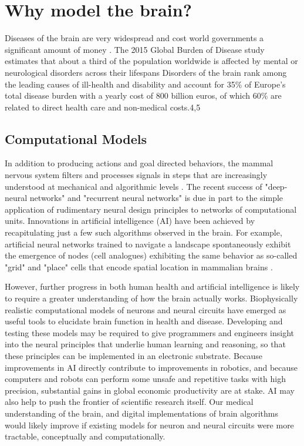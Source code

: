 \section{Why model the brain?}
Diseases of the brain are very widespread and cost world governments a significant amount of money \cite{who}.
The 2015 Global Burden of Disease study estimates that about a third of the population worldwide is affected by mental or neurological disorders across their lifespans
Disorders of the brain rank among the leading causes of ill-health and disability and account for 35\% of Europe’s total disease burden with a yearly cost of 800 billion euros, of which 60\% are related to direct health care and non-medical costs.4,5 %
\subsection{Computational Models}
In addition to producing actions and goal directed behaviors, the mammal nervous system filters and processes signals in steps that are increasingly understood at mechanical and algorithmic levels \cite{marr1976understanding}.
The recent success of "deep-neural networks" and "recurrent neural networks" is due in part to the simple application of rudimentary neural design principles to networks of computational units.
Innovations in artificial intelligence (AI) have been achieved by recapitulating just a few such algorithms observed in the brain.
For example, artificial neural networks trained to navigate a landscape spontaneously exhibit the emergence of nodes (cell analogues) exhibiting the same behavior as so-called "grid" and "place" cells that encode spatial location in mammalian brains \cite{banino2018vector}.

However, further progress in both human health and artificial intelligence is likely to require a greater understanding of how the brain actually works.
Biophysically realistic computational models of neurons and neural circuits have emerged as useful tools to elucidate brain function in health and disease.
Developing and testing these models may be required to give programmers and engineers insight into the neural principles that underlie human learning and reasoning, so that these principles can be implemented in an electronic substrate.
Because improvements in AI directly contribute to improvements in robotics, and because computers and robots can perform some unsafe and repetitive tasks with high precision, substantial gains in global economic productivity are at stake.
AI may also help to push the frontier of scientific research itself.
Our medical understanding of the brain, and digital implementations of brain algorithms would likely improve if existing models for neuron and neural circuits were more tractable, conceptually and computationally.

